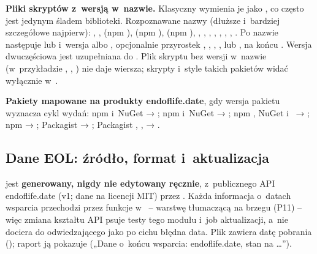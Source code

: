 \textbf{Pliki skryptów z~wersją w~nazwie.} Klasyczny  wymienia je jako
, co często jest jedynym śladem biblioteki. Rozpoznawane nazwy (dłuższe
i~bardziej szczegółowe najpierw): , ,
 (npm ),
 (npm ),  (npm
), , , ,
, , , ,
. Po nazwie następuje \repopath{-} lub  i~wersja
 albo , opcjonalnie przyrostek , ,
, ,  lub , na końcu
. Wersja dwuczęściowa jest uzupełniana do . Plik skryptu bez
wersji w~nazwie (w~przykładzie , ,
) nie daje wiersza; skrypty i~style takich pakietów widać wyłącznie
w~.

\textbf{Pakiety mapowane na produkty endoflife.date}, gdy wersja pakietu wyznacza cykl
wydań: npm i~NuGet  → ; npm i~NuGet  →
; npm , NuGet 
i~ → ; npm  →
; Packagist  → ; Packagist
, ,  →
.


\subsection{Dane EOL: źródło, format i~aktualizacja}\label{sec:risk-scan-eol}

 jest \textbf{generowany, nigdy nie edytowany ręcznie}, z~publicznego API
endoflife.date (v1; dane na licencji MIT) przez . Każda
informacja o~datach wsparcia przechodzi przez funkcje 
w~ -- warstwę tłumaczącą na brzegu (P11) -- więc zmiana
kształtu API psuje testy tego modułu i~job aktualizacji, a~nie dociera do odwiedzającego jako
po cichu błędna data. Plik zawiera datę pobrania (); raport ją pokazuje
(„Dane o~końcu wsparcia: endoflife.date, stan na …”).

